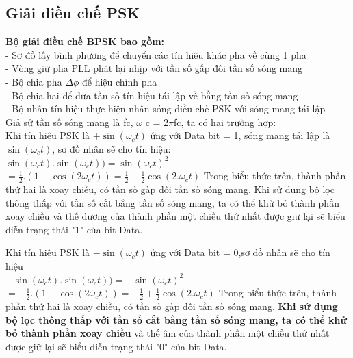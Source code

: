 \subsection{Giải điều chế PSK}
\textbf{Bộ giải điều chế BPSK bao gồm:} \\
- Sơ đồ lấy bình phương để chuyển các tín hiệu khác pha về cùng 1 pha \\ 
- Vòng giữ pha PLL phát lại nhịp với tần số gấp đôi tần số sóng mang \\ 
- Bộ chia pha $\Delta\phi$ để hiệu chỉnh pha \\ 
- Bộ chia hai để đưa tần số tín hiệu tái lập về bằng tần số sóng mang \\ 
- Bộ nhân tín hiệu thực hiện nhân sóng điều chế PSK với sóng mang tái lập \\ 
Giả sử tần số sóng mang là fc, $\omega$ c = 2$\pi$fc, ta có hai trường hợp: \\ 
Khi tín hiệu PSK là $+\sin(\omega_{c}t)$ ứng với Data bit = 1, sóng mang tái lập là $\sin(\omega_{c}t)$, sơ đồ nhân sẽ cho tín hiệu: \\
$\sin(\omega_{c}t).\sin(\omega_{c}t)) = \sin(\omega_{c}t)^{2}$
$ = \frac{1}{2}.(1 - \cos(2\omega_{c}t)) = \frac{1}{2} - \frac{1}{2} \cos(2.\omega_{c}t)$
Trong biểu thức trên, thành phần thứ hai là xoay chiều, có tần số gấp đôi tần số sóng mang. Khi sử dụng bộ lọc thông thấp với tần số cắt bằng tần số sóng mang, ta có thể khử bỏ thành phần xoay chiều và thế dương của thành phần một chiều thứ nhất được giữ lại sẽ biểu diễn trạng thái "1" của bit Data.

Khi tín hiệu PSK là $-\sin(\omega_{c}t)$ ứng với Data bit = 0,sơ đồ nhân sẽ cho tín hiệu \\
$-\sin(\omega_{c}t).\sin(\omega_{c}t)) = -\sin(\omega_{c}t)^{2}$
$ = -\frac{1}{2}.(1 - \cos(2\omega_{c}t)) = -\frac{1}{2} + \frac{1}{2} \cos(2.\omega_{c}t)$
Trong biểu thức trên, thành phần thứ hai là xoay chiều, có tần số gấp đôi tần số sóng mang. \textbf{Khi sử dụng bộ lọc thông thấp với tần số cắt bằng tần số sóng mang, ta có thể khử bỏ thành phần xoay chiều} và thế âm của thành phần một chiều thứ nhất được giữ lại sẽ biểu diễn trạng thái "0" của bit Data.
